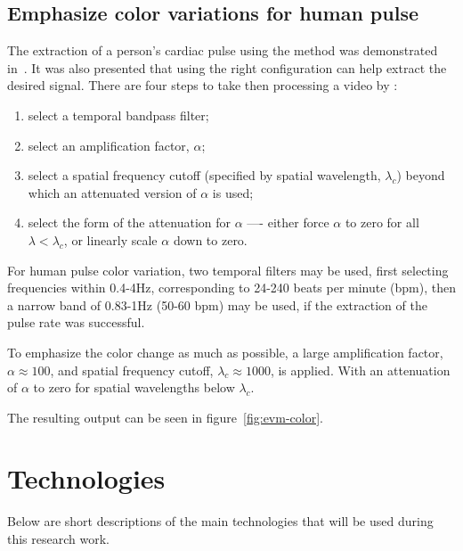 
\subsection{Emphasize color variations for human pulse} \label{sec:evm-color}

The extraction of a person's cardiac pulse using the \evm{} method 
was demonstrated in~\cite{Wu2012Eulerian}. It was also presented that
using the right configuration can help extract the desired signal.
There are four steps to take then processing a video by \evm{}: 

\begin{enumerate}
  \item select a temporal bandpass filter;
  \item select an amplification factor, $\alpha$;
  \item select a spatial frequency cutoff (specified by spatial wavelength, 
        $\lambda_c$) beyond which an attenuated version of $\alpha$ is used;
  \item select the form of the attenuation for $\alpha$ —- either force 
        $\alpha$ to zero for all $\lambda < \lambda_c$, or linearly scale 
        $\alpha$ down to zero.
\end{enumerate}

For human pulse color variation, two temporal filters may be used, first
selecting frequencies within 0.4-4Hz, corresponding to 24-240 beats per 
minute (bpm), then a narrow band of 0.83-1Hz (50-60 bpm) may be used, 
if the extraction of the pulse rate was successful.

To emphasize the color change as much as possible, a large amplification 
factor, $\alpha \approx 100$, and spatial frequency cutoff, 
$\lambda_c \approx 1000$, is applied. With an attenuation of $\alpha$ to
zero for spatial wavelengths below $\lambda_c$.

The resulting output can be seen in figure~\ref{fig:evm-color}.


\section{Technologies} \label{sec:technologies}

Below are short descriptions of the main technologies that will be 
used during this research work.

